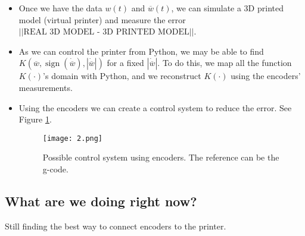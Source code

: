 \documentclass[12pt]{article}
\theoremstyle{definition}
\theoremstyle{remark}
\DeclareMathOperator{\sign}{sign}
\begin{document}
\begin{itemize}

\item Once we have the data $w(t)$ and $\overline{w}(t)$, we can simulate a 3D printed model (virtual printer) and measure the error $||\text{REAL 3D MODEL - 3D PRINTED MODEL}||$.

\item As we can control the printer from Python, we may be able to find $K(\overline{w},\sign(\dot{\overline{w}}),|\dot{\overline{w}}|)$ for a fixed $|\dot{\overline{w}}|$. To do this, we map all the function $K(\cdot)$'s domain with Python, and we reconstruct $K(\cdot)$ using the encoders' measurements.

\item Using the encoders we can create a control system to reduce the error.  See Figure \ref{pic2}.
\begin{figure}[ht!]
\centering
\texttt{[image: 2.png]}
\caption{Possible control system using encoders. The reference can be the g-code.}
\label{pic2}
\end{figure}

\end{itemize}

\subsection{What are we doing right now?}

Still finding the best way to connect encoders to the printer.
\end{document}
